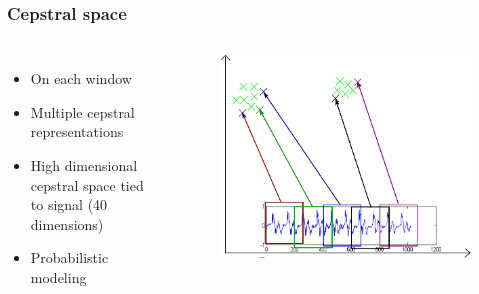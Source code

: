 \documentclass[11pt,english]{beamer}
\begin{document}
\begin{frame}
  \frametitle{Cepstral space}
  \begin{columns}
    \begin{itemize}
    \item On each window
    \item Multiple cepstral representations
    \item High dimensional cepstral space tied to signal (40 dimensions)
    \item Probabilistic modeling
    \end{itemize}
      \begin{figure}
        \centering
       \includegraphics[scale = 0.5]{cepstral_space.pdf}
      \end{figure}
  \end{columns}
\end{frame}
\end{document}
